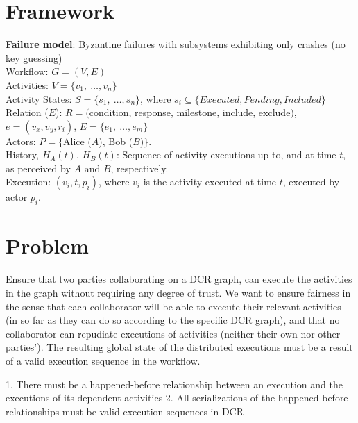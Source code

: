 \documentclass{article}
\begin{document}
	\section*{Framework}
	\textbf{Failure model}: Byzantine failures with subsystems exhibiting only crashes (no key guessing)\\
	\noindent
	Workflow: $G=(V,E)$ \\
	Activities: $V=\{v_1,\ \dots, v_n\}$ \\ %
	Activity States: $S=\{s_1,\ \dots, s_n\}$, where $s_i \subseteq \{Executed, Pending, Included\}$\\
	Relation ($E$): $R=($condition, response, milestone, include, exclude$)$, $e=(v_x, v_y, r_i)$, $E=\{e_1,\ \dots, e_m\}$\\
	Actors: $P =\{$Alice ($A$), Bob ($B$)$\}$.\\ %
	History, $H_A(t)$, $H_B(t)$: Sequence of activity executions up to, and at time $t$, as perceived by $A$ and $B$, respectively.\\
	Execution: $(v_i, t, p_i)$, where $v_i$ is the activity executed at time $t$, executed by actor $p_i$.\\

	\section*{Problem}
	Ensure that two parties collaborating on a DCR graph, can execute the activities in the graph without requiring any degree of trust. We want to ensure fairness in the sense that each collaborator will be able to execute their relevant activities (in so far as they can do so according to the specific DCR graph), and that no collaborator can repudiate executions of activities (neither their own nor other parties').
	The resulting global state of the distributed executions must be a result of a valid execution sequence in the workflow.

	1. There must be a happened-before relationship between an execution and the executions of its dependent activities
	2. All serializations of the happened-before relationships must be valid execution sequences in DCR
\end{document}
